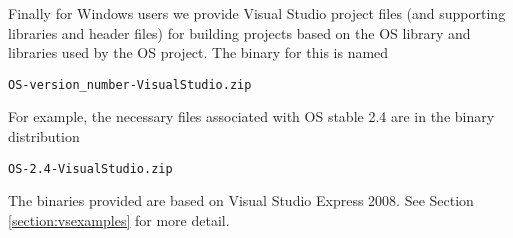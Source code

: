 Finally for Windows users we provide Visual Studio  project files 
(and supporting libraries and header files) for building projects based on the OS library and libraries 
used by the OS project. The binary for this is named
\begin{verbatim}
OS-version_number-VisualStudio.zip
\end{verbatim}
For example, the necessary files associated with  OS  stable 2.4 
are in the binary distribution
\begin{verbatim}
OS-2.4-VisualStudio.zip
\end{verbatim}
The binaries provided are based on Visual Studio Express 2008.  See Section \ref{section:vsexamples} for more detail.
